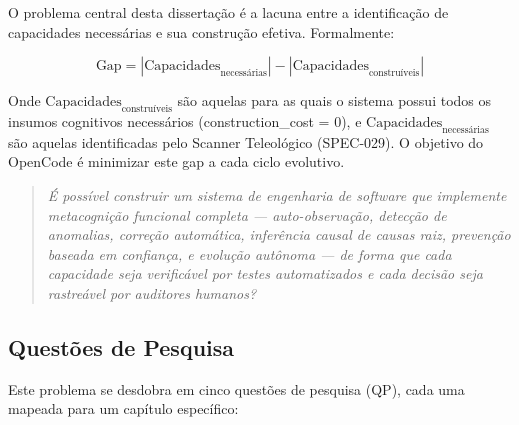 O problema central desta dissertação é a lacuna entre a identificação de capacidades necessárias e sua construção efetiva. Formalmente:

\begin{equation}
\text{Gap} = |\text{Capacidades}_{\text{necessárias}}| - |\text{Capacidades}_{\text{construíveis}}|
\label{eq:gap}
\end{equation}

Onde $\text{Capacidades}_{\text{construíveis}}$ são aquelas para as quais o sistema possui todos os insumos cognitivos necessários (construction\_cost = 0), e $\text{Capacidades}_{\text{necessárias}}$ são aquelas identificadas pelo Scanner Teleológico (SPEC-029). O objetivo do OpenCode é minimizar este gap a cada ciclo evolutivo.

\begin{quote}
\textit{É possível construir um sistema de engenharia de software que implemente metacognição funcional completa — auto-observação, detecção de anomalias, correção automática, inferência causal de causas raiz, prevenção baseada em confiança, e evolução autônoma — de forma que cada capacidade seja verificável por testes automatizados e cada decisão seja rastreável por auditores humanos?}
\end{quote}

\subsection{Questões de Pesquisa}

Este problema se desdobra em cinco questões de pesquisa (QP), cada uma mapeada para um capítulo específico:

